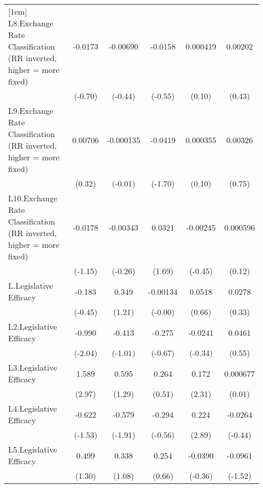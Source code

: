 {\begin{longtable}{l*{5}{c}}
[1em]
L8.Exchange Rate Classification (RR inverted, higher = more fixed)&  -0.0173         & -0.00690         &  -0.0158         & 0.000419         &  0.00202         \\
                &  (-0.70)         &  (-0.44)         &  (-0.55)         &   (0.10)         &   (0.43)         \\
[1em]
L9.Exchange Rate Classification (RR inverted, higher = more fixed)&  0.00706         &-0.000135         &  -0.0419         & 0.000355         &  0.00326         \\
                &   (0.32)         &  (-0.01)         &  (-1.70)         &   (0.10)         &   (0.75)         \\
[1em]
L10.Exchange Rate Classification (RR inverted, higher = more fixed)&  -0.0178         & -0.00343         &   0.0321         & -0.00245         & 0.000596         \\
                &  (-1.15)         &  (-0.26)         &   (1.69)         &  (-0.45)         &   (0.12)         \\
[1em]
L.Legislative Efficacy&   -0.183         &    0.349         & -0.00134         &   0.0518         &   0.0278         \\
                &  (-0.45)         &   (1.21)         &  (-0.00)         &   (0.66)         &   (0.33)         \\
[1em]
L2.Legislative Efficacy&   -0.990\sym{*}  &   -0.413         &   -0.275         &  -0.0241         &   0.0461         \\
                &  (-2.04)         &  (-1.01)         &  (-0.67)         &  (-0.34)         &   (0.55)         \\
[1em]
L3.Legislative Efficacy&    1.589\sym{**} &    0.595         &    0.264         &    0.172\sym{*}  & 0.000677         \\
                &   (2.97)         &   (1.29)         &   (0.51)         &   (2.31)         &   (0.01)         \\
[1em]
L4.Legislative Efficacy&   -0.622         &   -0.579         &   -0.294         &    0.224\sym{**} &  -0.0264         \\
                &  (-1.53)         &  (-1.91)         &  (-0.56)         &   (2.89)         &  (-0.44)         \\
[1em]
L5.Legislative Efficacy&    0.499         &    0.338         &    0.254         &  -0.0390         &  -0.0961         \\
                &   (1.30)         &   (1.08)         &   (0.66)         &  (-0.36)         &  (-1.52)         \\

\end{longtable}}
